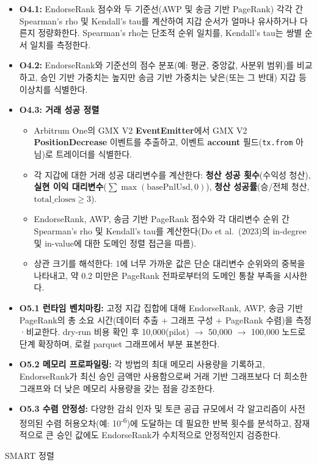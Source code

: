 \begin{itemize}
\item[\textbullet] \textbf{O4.1: }EndorseRank 점수와 두 기준선(AWP 및 송금 기반 PageRank) 각각 간 Spearman's rho 및 Kendall's tau를 계산하여 지갑 순서가 얼마나 유사하거나 다른지 정량화한다. Spearman's rho는 단조적 순위 일치를, Kendall's tau는 쌍별 순서 일치를 측정한다.
\item[\textbullet] \textbf{O4.2:}\textbf{ }EndorseRank와 기준선의 점수 분포(예: 평균, 중앙값, 사분위 범위)를 비교하고, 승인 기반 가중치는 높지만 송금 기반 가중치는 낮은(또는 그 반대) 지갑 등 이상치를 식별한다.
\item[\textbullet] \textbf{O4.3: 거래 성공 정렬}
\begin{itemize}
\item[\textendash] Arbitrum One의 GMX V2 \textbf{EventEmitter}에서 GMX V2 \textbf{PositionDecrease} 이벤트를 추출하고, 이벤트 \textbf{account} 필드(\texttt{tx.from} 아님)로 트레이더를 식별한다.
\item[\textendash] 각 지갑에 대한 거래 성공 대리변수를 계산한다: \textbf{청산 성공 횟수}(수익성 청산), \textbf{실현 이익 대리변수}($\sum \max(\text{basePnlUsd}, 0)$), \textbf{청산 성공률}(승/전체 청산, $\text{total\_closes} \geq 3$).
\item[\textendash] EndorseRank, AWP, 송금 기반 PageRank 점수와 각 대리변수 순위 간 Spearman's rho 및 Kendall's tau를 계산한다(Do et al.\ (2023)의 in-degree 및 in-value에 대한 도메인 정렬 접근을 따름).
\item[\textendash] 상관 크기를 해석한다: 1에 너무 가까운 값은 단순 대리변수 순위와의 중복을 나타내고, 약 0.2 미만은 PageRank 전파로부터의 도메인 통찰 부족을 시사한다.
\end{itemize}
\end{itemize}

\begin{itemize}
\item[\textbullet] \textbf{O5.1 런타임 벤치마킹: }고정 지갑 집합에 대해 EndorseRank, AWP, 송금 기반 PageRank의 총 소요 시간(데이터 추출 + 그래프 구성 + PageRank 수렴)을 측정·비교한다. dry-run 비용 확인 후 10,000(pilot) $\to$ 50,000 $\to$ 100,000 노드로 단계 확장하며, 로컬 parquet 그래프에서 부분 표본한다.
\item[\textbullet] \textbf{O5.2 메모리 프로파일링: }각 방법의 최대 메모리 사용량을 기록하고, EndorseRank가 최신 승인 금액만 사용함으로써 거래 기반 그래프보다 더 희소한 그래프와 더 낮은 메모리 사용량을 갖는 점을 강조한다.
\item[\textbullet] \textbf{O5.3 수렴 안정성}\textbf{: }다양한 감쇠 인자 및 토큰 공급 규모에서 각 알고리즘이 사전 정의된 수렴 허용오차(예: 10\textsuperscript{-}\textsuperscript{6})에 도달하는 데 필요한 반복 횟수를 분석하고, 잠재적으로 큰 승인 값에도 EndorseRank가 수치적으로 안정적인지 검증한다.
\end{itemize}
SMART 정렬


